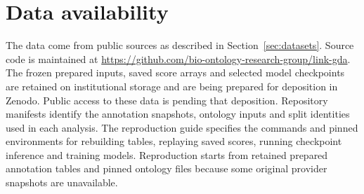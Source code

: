 \documentclass[webpdf,contemporary,large]{oup-authoring-template}%
\theoremstyle{thmstyleone}%
\theoremstyle{thmstyletwo}%
\theoremstyle{thmstylethree}%
\begin{document}
\section*{Data availability}
The data come from public sources as described in Section~\ref{sec:datasets}.
Source code is maintained at
\url{https://github.com/bio-ontology-research-group/link-gda}.
The frozen prepared inputs, saved score arrays and selected model checkpoints
are retained on institutional storage and are being prepared for deposition
in Zenodo. Public access to these data is pending that deposition. Repository
manifests identify the annotation snapshots, ontology inputs and split
identities used in each analysis. The reproduction guide specifies
the commands and pinned environments for rebuilding tables, replaying saved
scores, running checkpoint inference and training models. Reproduction starts
from retained prepared annotation tables and pinned ontology files because
some original provider snapshots are unavailable.


%
%






\end{document}
